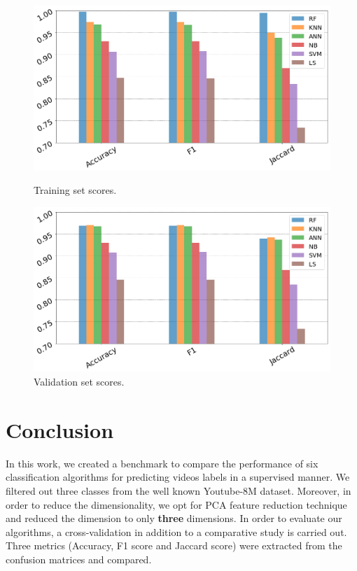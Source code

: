 \documentclass{article}
\begin{document}
\begin{figure}[!htb]
\center
   \begin{minipage}{0.5\textwidth}
     \centering
     \includegraphics[width=\linewidth]{img/comparison1}
     \caption{Training set scores.}\label{fig:comparison1}
   \end{minipage}%
   \begin{minipage}{0.5\textwidth}
     \centering
     \includegraphics[width=\linewidth]{img/comparison2}
     \caption{Validation set scores.}\label{fig:comparison2}
   \end{minipage}
\end{figure}



\section{Conclusion}
In this work, we created a benchmark to compare the performance of six classification algorithms for predicting videos labels in a supervised manner. We filtered out three classes from the well known Youtube-8M dataset. Moreover, in order to reduce the dimensionality, we opt for PCA feature reduction technique and reduced the dimension to only \textbf{three} dimensions. In order to evaluate our algorithms, a cross-validation in addition to a comparative study is carried out. Three metrics (Accuracy, F1 score and Jaccard score) were extracted from the confusion matrices and compared.
\end{document}
